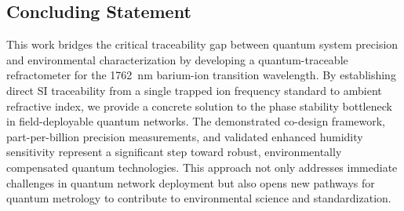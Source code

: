 \documentclass[aip,reprint,groupedaddress,onecolumn,superscriptaddress]{revtex4-2}
\begin{document}
\subsection{Concluding Statement}
This work bridges the critical traceability gap between quantum system precision and environmental characterization by developing a quantum-traceable refractometer for the \SI{1762}{\nano\meter} barium-ion transition wavelength. By establishing direct SI traceability from a single trapped ion frequency standard to ambient refractive index, we provide a concrete solution to the phase stability bottleneck in field-deployable quantum networks. The demonstrated co-design framework, part-per-billion precision measurements, and validated enhanced humidity sensitivity represent a significant step toward robust, environmentally compensated quantum technologies. This approach not only addresses immediate challenges in quantum network deployment but also opens new pathways for quantum metrology to contribute to environmental science and standardization.
\end{document}
